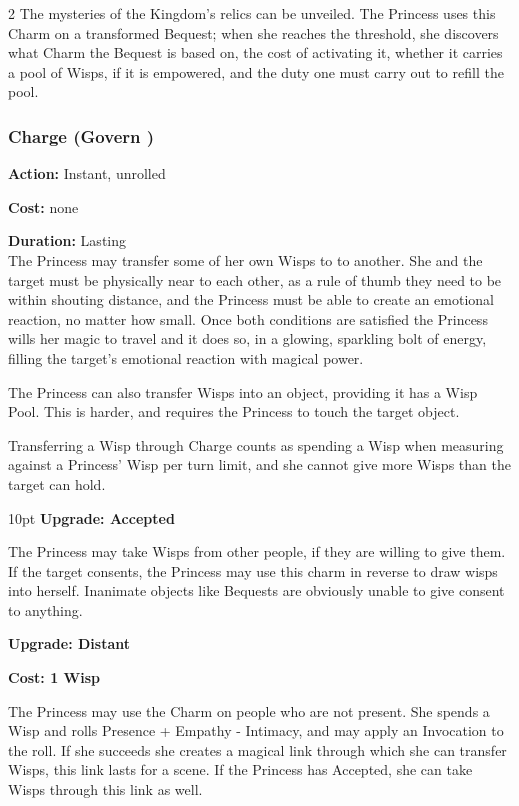 \begin{multicols}{2}
The mysteries of the Kingdom's relics can be unveiled. The Princess uses this Charm on a transformed Bequest; when she reaches the threshold, she discovers what Charm the Bequest is based on, the cost of activating it, whether it carries a pool of Wisps, if it is empowered, and the duty one must carry out to refill the pool.

\subsubsection*{Charge (Govern \textbullet\textbullet)}

\noindent \textbf{Action:} Instant, unrolled

\noindent \textbf{Cost:} none

\noindent \textbf{Duration:} Lasting \\

\noindent The Princess may transfer some of her own Wisps to to another. She and the target must be physically near to each other, as a rule of thumb they need to be within shouting distance, and the Princess must be able to create an emotional reaction, no matter how small. Once both conditions are satisfied the Princess wills her magic to travel and it does so, in a glowing, sparkling bolt of energy, filling the target's emotional reaction with magical power. 

The Princess can also transfer Wisps into an object, providing it has a Wisp Pool. This is harder, and requires the Princess to touch the target object. 

Transferring a Wisp through Charge counts as spending a Wisp when measuring against a Princess' Wisp per turn limit, and she cannot give more Wisps than the target can hold.

\begin{myindentpar}{10pt} \textbf{Upgrade: Accepted}

The Princess may take Wisps from other people, if they are willing to give them. If the target consents, the Princess may use this charm in reverse to draw wisps into herself. Inanimate objects like Bequests are obviously unable to give consent to anything. 

\textbf{Upgrade: Distant}

\textbf{Cost: 1 Wisp}

\noindent The Princess may use the Charm on people who are not present. She spends a Wisp and rolls Presence + Empathy - Intimacy, and may apply an Invocation to the roll. If she succeeds she creates a magical link through which she can transfer Wisps, this link lasts for a scene. If the Princess has Accepted, she can take Wisps through this link as well. 


\end{myindentpar}
\end{multicols}
